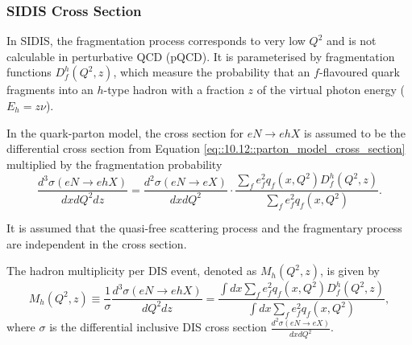\subsubsection{SIDIS Cross Section}
\label{10.21::sidis_cross_section}
    In SIDIS, the fragmentation process corresponds to very low $Q^2$ and is not calculable in perturbative QCD (pQCD).
    It is parameterised by fragmentation functions $D_f^h(Q^2, z)$, which measure the probability that an $f$-flavoured quark fragments into an $h$-type hadron with a fraction $z$ of the virtual photon energy ($E_h = z\nu$).

    In the quark-parton model, the cross section for $eN \rightarrow ehX$ is assumed to be the differential cross section from Equation \eqref{eq::10.12::parton_model_cross_section} multiplied by the fragmentation probability
    \begin{equation}
        \frac{d^3\sigma(eN \rightarrow ehX)}{dxdQ^2dz} =
            \frac{d^2\sigma(eN \rightarrow eX)}{dxdQ^2} \cdot
            \frac{\sum_f e^2_f q_f(x,Q^2) D^h_f(Q^2,z)}{\sum_f e^2_f q_f(x,Q^2)}.
        \label{eq::10.21::fragmentation_probability}
    \end{equation}

    It is assumed that the quasi-free scattering process and the fragmentary process are independent in the cross section.

    The hadron multiplicity per DIS event, denoted as $M_h(Q^2, z)$, is given by
    \begin{equation*}
        M_h(Q^2,z) \equiv \frac{1}{\sigma} \frac{d^3\sigma(eN \rightarrow ehX)}{dQ^2dz} = \frac{\int dx \sum_f e^2_f q_f(x,Q^2) D^h_f(Q^2,z)}{\int dx \sum_f e^2_f q_f(x,Q^2)},
    \end{equation*}
    where $\sigma$ is the differential inclusive DIS cross section $\frac{d^2\sigma(eN \rightarrow eX)}{dxdQ^2}$.
